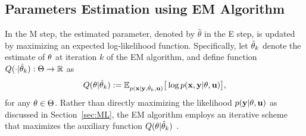 \subsection{Parameters Estimation using EM Algorithm} 
\label{sec:Parameters Estimation using EM algorithm}

In the M step, the estimated parameter, denoted by $\hat{\theta}$ in the E step, is updated by maximizing an expected log-likelihood function. Specifically, let  $\hat{{ \mathrm{\theta} }}_k$ denote the estimate of ${ \mathrm{\theta} }$ at iteration $k$ of the EM algorithm, and define function $Q(\cdot|\hat{{ \mathrm{\theta} }}_k):\Theta\to{\mathbb{R}}$ as
\begin{equation} \label{eqn:Q_theta_theta_k}
    Q({ \mathrm{\theta} }|\hat{{ \mathrm{\theta} }}_k) 
    := 
    \mathbb{E}_{p(\mathbf{x} |\mathbf{y},\hat{{ \mathrm{\theta} }}_k,\mathbf{u})} \big[\log p(\mathbf{x},\mathbf{y}|{ \mathrm{\theta} },\mathbf{u})\big],    
\end{equation}
for any ${ \mathrm{\theta} }\in\Theta$.
Rather than directly maximizing the likelihood $p(\mathbf{y}|{ \mathrm{\theta} },\mathbf{u})$ as discussed in Section~\ref{sec:ML}, the EM algorithm employs an iterative scheme that maximizes the auxiliary function $Q({ \mathrm{\theta} }|\hat{{ \mathrm{\theta} }}_k)$ \cite{little2019statistical}.
